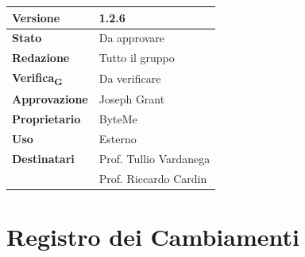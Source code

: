 \documentclass[11pt,a4paper]{article}
\newcommand{\gls}[1]{#1\textsubscript{G}}
\begin{document}
\begin{titlepage}
    \begin{table}[H]
        \centering
        \begin{tabular}{|l|p{5cm}|}
            \hline
            \textbf{Versione} & 1.2.6 \\
            \hline
            \textbf{Stato} & Da approvare \\
            \hline
            \textbf{Redazione} & Tutto il gruppo \\
            \hline
            \textbf{\gls{Verifica}} & Da verificare \\
            \hline
            \textbf{Approvazione} & Joseph Grant \\
            \hline
            \textbf{Proprietario} & ByteMe \\
            \hline
            \textbf{Uso} & Esterno \\
            \hline
            \textbf{Destinatari} & Prof. Tullio Vardanega \\ & Prof. Riccardo Cardin \\
            \hline
        \end{tabular}
    \end{table}
    
    \vfill
\end{titlepage}

\thispagestyle{empty}
\section*{Registro dei Cambiamenti}
\end{document}
